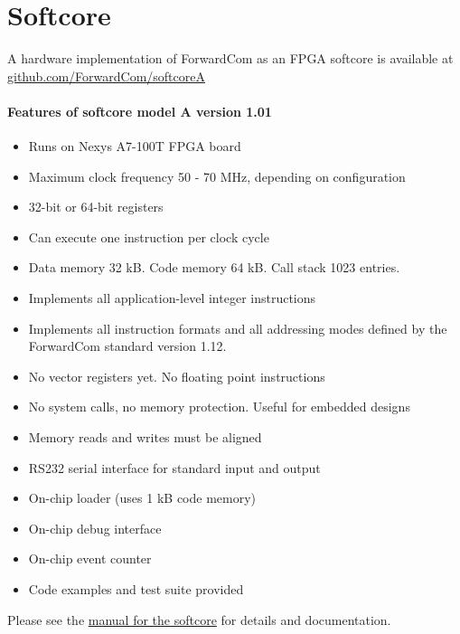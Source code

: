 \documentclass[forwardcom.tex]{subfiles}
\begin{document}
\RaggedRight

\chapter{Softcore}
A hardware implementation of ForwardCom as an FPGA softcore is available at \\
\href{https://github.com/ForwardCom/softcoreA}{github.com/ForwardCom/softcoreA}
\vv

\subsubsection{Features of softcore model A version 1.01}
\begin{itemize}
\item Runs on Nexys A7-100T FPGA board
\item Maximum clock frequency 50 - 70 MHz, depending on configuration
\item 32-bit or 64-bit registers
\item Can execute one instruction per clock cycle
\item Data memory 32 kB. Code memory 64 kB. Call stack 1023 entries.
\item Implements all application-level integer instructions
\item Implements all instruction formats and all addressing modes defined by the ForwardCom standard version 1.12.
\item No vector registers yet. No floating point instructions
\item No system calls, no memory protection. Useful for embedded designs
\item Memory reads and writes must be aligned
\item RS232 serial interface for standard input and output
\item On-chip loader (uses 1 kB code memory)
\item On-chip debug interface
\item On-chip event counter
\item Code examples and test suite provided
\end{itemize}
\vv

Please see the 
\href{https://github.com/ForwardCom/softcoreA/raw/main/softcore_A.pdf}{manual for the softcore} 
for details and documentation.
\vv
\end{document}
